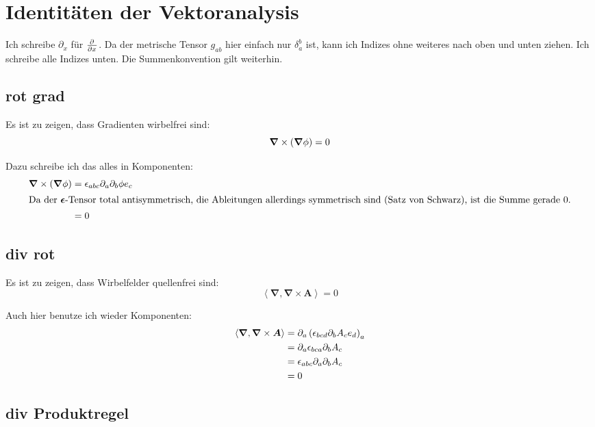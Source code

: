 \documentclass[11pt, ngerman]{article}
\newcommand{\divergence}[1]{\inner{\vnabla}{#1}}
\newcommand{\inner}[2]{\left\langle #1, #2 \right\rangle}
\newcommand{\tens}[1]{\boldsymbol{#1}}
\newcommand{\vnabla}{\vec \nabla}
\renewcommand{\vec}[1]{\boldsymbol{#1}}
\begin{document}

\section{Identitäten der Vektoranalysis}

Ich schreibe $\partial_x$ für $\pd{}x$. Da der metrische Tensor $g_{ab}$ hier
einfach nur $\delta_a^b$ ist, kann ich Indizes ohne weiteres nach oben und
unten ziehen. Ich schreibe alle Indizes unten. Die Summenkonvention gilt
weiterhin.

\subsection{rot grad}

Es ist zu zeigen, dass Gradienten wirbelfrei sind:
\[ \vnabla \times \del{\vnabla \phi} = 0 \]

Dazu schreibe ich das alles in Komponenten:
%
\begin{align*}
	\vnabla \times \del{\vnabla \phi} &=
	\epsilon_{abc} \partial_a \partial_b \phi e_c \\
	\intertext{Da der $\tens \epsilon$-Tensor total antisymmetrisch, die Ableitungen allerdings symmetrisch sind (Satz von Schwarz), ist die Summe gerade 0.}
	&= 0
\end{align*}

\subsection{div rot}

Es ist zu zeigen, dass Wirbelfelder quellenfrei sind:
\[ \divergence{\vnabla \times \vec A} = 0 \]

Auch hier benutze ich wieder Komponenten:
%
\begin{align*}
	\divergence{\vnabla \times \vec A}
	&= \partial_a \del{\epsilon_{bcd} \partial_b A_c e_d}_a \\
	&= \partial_a \epsilon_{bca} \partial_b A_c \\
	&= \epsilon_{abc} \partial_a \partial_b A_c \\
	&= 0
\end{align*}

\subsection{div Produktregel}
\end{document}

